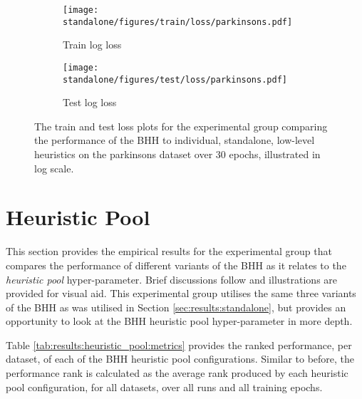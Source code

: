 \begin{figure}[htbp]
	\begin{subfigure}{0.5\textwidth}
		\centering
		\texttt{[image: standalone/figures/train/loss/parkinsons.pdf]}
		\caption{Train log loss}
		\label{fig:results:standalone:figures:loss:train:parkinsons}
	\end{subfigure}
	\begin{subfigure}{0.5\textwidth}
		\centering
		\texttt{[image: standalone/figures/test/loss/parkinsons.pdf]}
		\caption{Test log loss}
		\label{fig:results:standalone:figures:loss:test:parkinsons}
	\end{subfigure}
	\par\bigskip
	\caption{The train and test loss plots for the experimental group comparing the performance of the \acs{BHH} to individual, standalone, low-level heuristics on the parkinsons dataset over 30 epochs, illustrated in log scale.}
	\label{fig:results:standalone:figures:parkinsons}
\end{figure}




\section{Heuristic Pool}\label{sec:results:heuristic_pool}

This section provides the empirical results for the experimental group that compares the performance of different variants of the \acs{BHH} as it relates to the \textit{heuristic pool} hyper-parameter. Brief discussions follow and illustrations are provided for visual aid. This experimental group utilises the same three variants of the \acs{BHH} as was utilised in Section \ref{sec:results:standalone}, but provides an opportunity to look at the \acs{BHH} heuristic pool hyper-parameter in more depth.

Table \ref{tab:results:heuristic_pool:metrics} provides the ranked performance, per dataset, of each of the \acs{BHH} heuristic pool configurations. Similar to before, the performance rank is calculated as the average rank produced by each heuristic pool configuration, for all datasets, over all runs and all training epochs.



